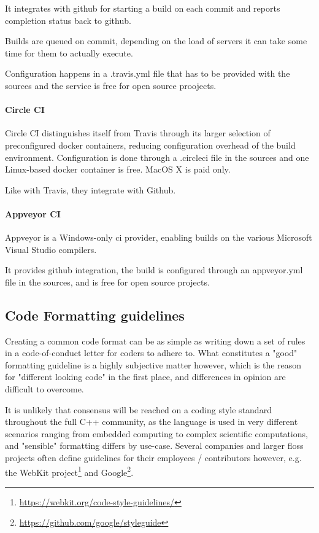 It integrates with github for starting a build on each commit and reports completion status back to github.

Builds are queued on commit, depending on the load of servers it can take some time for them to actually execute.

Configuration happens in a .travis.yml file that has to be provided with the sources and the service is free for open source proojects.

\paragraph{Circle CI}
Circle CI distinguishes itself from Travis through its larger selection of preconfigured docker containers, reducing configuration overhead of the build environment.
Configuration is done through a .circleci file in the sources and one Linux-based docker container is free. MacOS X is paid only.

Like with Travis, they integrate with Github.

\paragraph{Appveyor CI}
Appveyor is a Windows-only \gls{ci} provider, enabling builds on the various Microsoft Visual Studio compilers.

It provides github integration, the build is configured through an appveyor.yml file in the sources, and is free for open source projects.

\subsection{Code Formatting guidelines}
\label{sec:resformat}
Creating a common code format can be as simple as writing down a set of rules in a code-of-conduct letter for coders to adhere to. What constitutes a "good" formatting guideline is a highly subjective matter however, which is the reason for "different looking code" in the first place, and differences in opinion are difficult to overcome.

It is unlikely that consensus will be reached on a coding style standard throughout the full C++ community, as the language is used in very different scenarios ranging from embedded computing to complex scientific computations, and "sensible" formatting differs by use-case. Several companies and larger \gls{floss} projects often define guidelines for their employees / contributors however,
e.g. the WebKit project\footnote{\url{https://webkit.org/code-style-guidelines/}} and Google\footnote{\url{https://github.com/google/styleguide}}.

